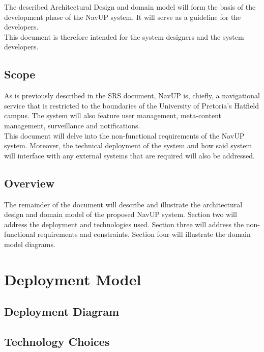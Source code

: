\documentclass{article}
\begin{document}
			\noindent The described Architectural Design and domain model will form the basis of the development phase of the NavUP system. It will serve as a guideline for the developers.\\
			
			\noindent This document is therefore intended for the system designers and the system developers.
			
			\subsection{Scope}\label{sec: scope}
				As is previously described in the SRS document, NavUP is, chiefly, a navigational service that is restricted to the boundaries of the University of Pretoria's Hatfield campus. The system will also feature user management, meta-content management, surveillance and notifications.\\
				
				\noindent This document will delve into the non-functional requirements of the NavUP system. Moreover, the technical deployment of the system and how said system will interface with any external systems that are required will also be addressed.
				
				\subsection{Overview}\label{sec: overview}
					The remainder of the document will describe and illustrate the architectural design and domain model of the proposed NavUP system. Section two will address the deployment and technologies used. Section three will address the non-functional requirements and constraints. Section four will illustrate the domain model diagrams.
					
	\clearpage
	
	\section{Deployment Model}\label{sec: deployment-model}
	
		\subsection{Deployment Diagram}\label{subsec:deployment-diagram}

		\clearpage
	
		\subsection{Technology Choices}\label{sec:technology-choices}
	
\end{document}
